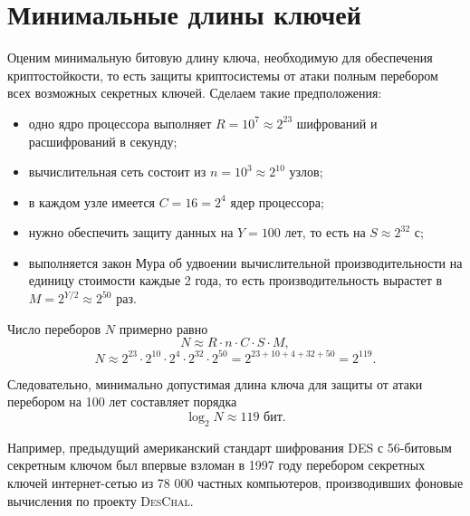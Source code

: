 \section{Минимальные длины ключей}

Оценим минимальную битовую длину ключа, необходимую для обеспечения криптостойкости, то есть защиты криптосистемы от атаки полным перебором всех возможных секретных ключей. Сделаем такие предположения:

\begin{itemize}
    \item одно ядро процессора выполняет $R = 10^7 \approx 2^{23}$ шифрований и расшифрований в секунду;
    \item вычислительная сеть состоит из $n = 10^3 \approx 2^{10}$ узлов;
    \item в каждом узле имеется $C = 16 = 2^4$ ядер процессора;
    \item нужно обеспечить защиту данных на $Y = 100$ лет, то есть на $S \approx 2^{32}$ с;
    \item выполняется закон Мура об удвоении вычислительной производительности на единицу стоимости каждые 2 года, то есть производительность вырастет в $M = 2^{Y/2} \approx 2^{50}$ раз.
\end{itemize}

Число переборов $N$ примерно равно
    \[ N \approx R \cdot n \cdot C \cdot S \cdot M, \]
    \[ N \approx 2^{23} \cdot 2^{10} \cdot 2^{4} \cdot 2^{32} \cdot 2^{50} = 2^{23+10+4+32+50} = 2^{119}. \]

Следовательно, минимально допустимая длина ключа для защиты от атаки перебором на 100 лет составляет порядка
    \[ \log_2 N \approx 119\text{ бит}. \]

Например, предыдущий американский стандарт шифрования DES с 56-битовым секретным ключом был впервые взломан в 1997 году перебором секретных ключей интернет-сетью из 78 000 частных компьютеров, производивших фоновые вычисления по проекту \textsc{DesChal}.
